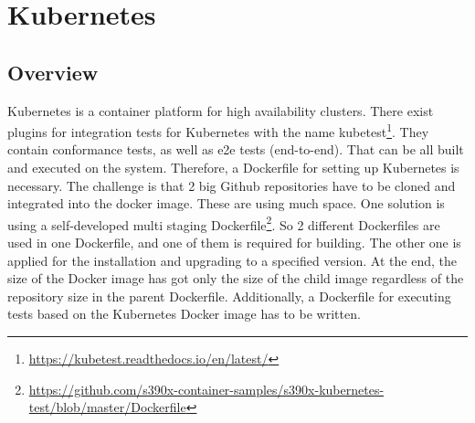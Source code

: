 \chapter{Kubernetes}\label{ch:kubernetes}

\section{Overview}

Kubernetes is a container platform for high availability clusters.
There exist plugins for integration tests for Kubernetes with the name kubetest\footnote{\url{https://kubetest.readthedocs.io/en/latest/}}. They contain conformance tests, as well as e2e tests (end-to-end).
That can be all built and executed on the system. Therefore, a Dockerfile for setting up Kubernetes is necessary. The challenge is that 2 big Github repositories have to be cloned and integrated into the docker image. These are using much space. One solution is using a self-developed multi staging Dockerfile\footnote{\url{https://github.com/s390x-container-samples/s390x-kubernetes-test/blob/master/Dockerfile}}. 
So 2 different Dockerfiles are used in one Dockerfile, and one of them is required for building. The other one is applied for the installation and upgrading to a specified version. At the end, the size of the Docker image has got only the size of the child image regardless of the repository size in the parent Dockerfile.
Additionally, a Dockerfile for executing tests based on the Kubernetes Docker image has to be written.


